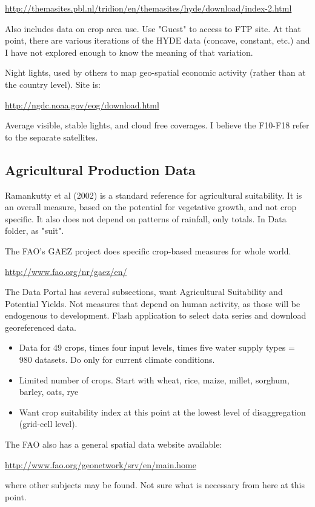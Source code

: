 \documentclass[10pt]{article}
\begin{document}
\url{http://themasites.pbl.nl/tridion/en/themasites/hyde/download/index-2.html}

Also includes data on crop area use. Use "Guest" to access to FTP site. At that point, there are various iterations of the HYDE data (concave, constant, etc.) and I have not explored enough to know the meaning of that variation. 

Night lights, used by others to map geo-spatial economic activity (rather than at the country level). Site is:

\url{http://ngdc.noaa.gov/eog/download.html}

Average visible, stable lights, and cloud free coverages. I believe the F10-F18 refer to the separate satellites.

\subsection{Agricultural Production Data}
Ramankutty et al (2002) is a standard reference for agricultural suitability. It is an overall measure, based on the potential for vegetative growth, and not crop specific. It also does not depend on patterns of rainfall, only totals. In Data folder, as "suit".

The FAO's GAEZ project does specific crop-based measures for whole world. 

\url{http://www.fao.org/nr/gaez/en/}

The Data Portal has several subsections, want Agricultural Suitability and Potential Yields. Not measures that depend on human activity, as those will be endogenous to development. Flash application to select data series and download georeferenced data. 
\begin{itemize}
	\item Data for 49 crops, times four input levels, times five water supply types = 980 datasets. Do only for current climate conditions.
	\item Limited number of crops. Start with wheat, rice, maize, millet, sorghum, barley, oats, rye
	\item Want crop suitability index at this point at the lowest level of disaggregation (grid-cell level).
\end{itemize}

The FAO also has a general spatial data website available:

\url{http://www.fao.org/geonetwork/srv/en/main.home}

where other subjects may be found. Not sure what is necessary from here at this point.
\end{document}
